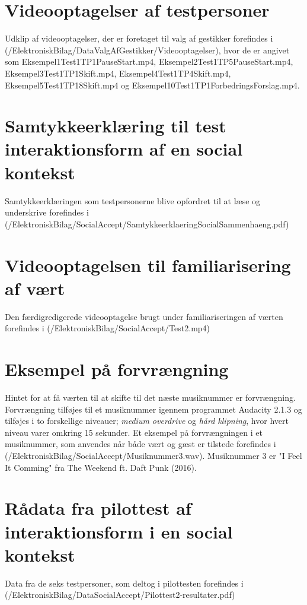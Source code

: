 \section{Videooptagelser af testpersoner}
\label{app:VideooptagelseValgAfGestikkerTestpersoner}
%
Udklip af videooptagelser, der er foretaget til valg af gestikker forefindes i (/ElektroniskBilag/DataValgAfGestikker/Videooptagelser), hvor de er angivet som Eksempel1Test1TP1PauseStart.mp4, Eksempel2Test1TP5PauseStart.mp4, Eksempel3Test1TP1Skift.mp4, Eksempel4Test1TP4Skift.mp4, Eksempel5Test1TP18Skift.mp4 og Eksempel10Test1TP1ForbedringsForslag.mp4.
%
\section{Samtykkeerklæring til test interaktionsform af en social kontekst}
\label{app:SamtykkeerklaeringSocialAccept}
%
Samtykkeerklæringen som testpersonerne blive opfordret til at læse og underskrive forefindes i (/ElektroniskBilag/SocialAccept/SamtykkeerklaeringSocialSammenhaeng.pdf)
%
\section{Videooptagelsen til familiarisering af vært}
\label{app:VideooptagelseFam}
%
Den færdigredigerede videooptagelse brugt under familiariseringen af værten forefindes i (/ElektroniskBilag/SocialAccept/Test2.mp4)
%
\section{Eksempel på forvrængning}
\label{app:ForvraengningHint}
%
Hintet for at få værten til at skifte til det næste musiknummer er forvrængning. Forvrængning tilføjes til et musiknummer igennem programmet Audacity 2.1.3 og tilføjes i to forskellige niveauer; \textit{medium overdrive} og \textit{hård klipning}, hvor hvert niveau varer omkring 15 sekunder. Et eksempel på forvrængningen i et musiknummer, som anvendes når både vært og gæst er tilstede forefindes i (/ElektroniskBilag/SocialAccept/Musiknummer3.wav). Musiknummer 3 er "I Feel It Comming" fra The Weekend ft. Daft Punk (2016).
%
\section{Rådata fra pilottest af interaktionsform i en social kontekst}
\label{app:ResultaterPilottestSocialAccept}
%
Data fra de seks testpersoner, som deltog i pilottesten forefindes i \\
(/ElektroniskBilag/DataSocialAccept/Pilottest2-resultater.pdf)
%
